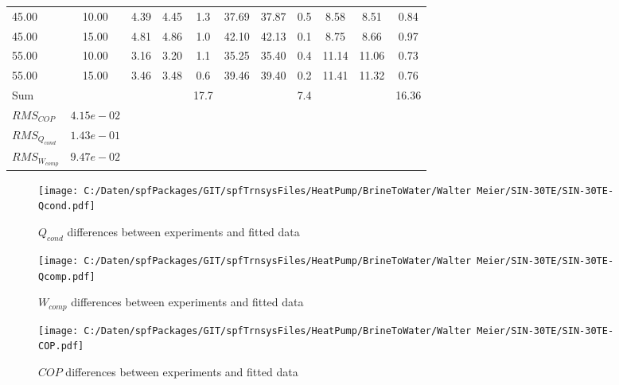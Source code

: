 \documentclass[english]{SPFShortReport}
\begin{document}
\begin{table}[!ht]
\begin{small}
\begin{center}
{\begin{tabular}{l | c c c c c c c c c c }
45.00  & 10.00 & 4.39 & 4.45 & 1.3 & 37.69 & 37.87 & 0.5 & 8.58 & 8.51 & 0.84\\ 
45.00  & 15.00 & 4.81 & 4.86 & 1.0 & 42.10 & 42.13 & 0.1 & 8.75 & 8.66 & 0.97\\ 
55.00  & 10.00 & 3.16 & 3.20 & 1.1 & 35.25 & 35.40 & 0.4 & 11.14 & 11.06 & 0.73\\ 
55.00  & 15.00 & 3.46 & 3.48 & 0.6 & 39.46 & 39.40 & 0.2 & 11.41 & 11.32 & 0.76\\ 
\hline 
 Sum &  & &  & 17.7 &  &  & 7.4 & &  & 16.36\\ 
\hline 
 $RMS_{COP}$ & $4.15e-02$ \\ 
 $RMS_{Q_{cond}}$ & $1.43e-01$ \\ 
 $RMS_{W_{comp}}$ & $9.47e-02$ \\ 
\hline
\hline
\end{tabular}
}
\label{ErrorsTable}
\end{center}
\end{small}
\end{table}
\begin{figure}[!ht]
\begin{center}
\texttt{[image: C:/Daten/spfPackages/GIT/spfTrnsysFiles/HeatPump/BrineToWater/Walter Meier/SIN-30TE/SIN-30TE-Qcond.pdf]}
\caption{$Q_{cond}$ differences between experiments and fitted data}
\label{QcongFig}
\end{center}
\end{figure}
\begin{figure}[!ht]
\begin{center}
\texttt{[image: C:/Daten/spfPackages/GIT/spfTrnsysFiles/HeatPump/BrineToWater/Walter Meier/SIN-30TE/SIN-30TE-Qcomp.pdf]}
\caption{$W_{comp}$ differences between experiments and fitted data}
\label{QcompFig}
\end{center}
\end{figure}
\begin{figure}[!ht]
\begin{center}
\texttt{[image: C:/Daten/spfPackages/GIT/spfTrnsysFiles/HeatPump/BrineToWater/Walter Meier/SIN-30TE/SIN-30TE-COP.pdf]}
\caption{$COP$ differences between experiments and fitted data}
\label{COPFig}
\end{center}
\end{figure}
\end{document}

